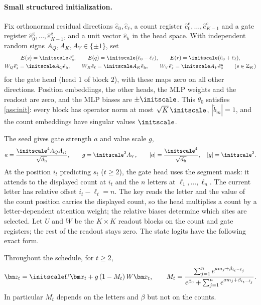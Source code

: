 \paragraph{Small structured initialization.} Fix orthonormal residual directions $\hat e_{0},\hat e_\ell$, a count register
$\hat e^{\mathrm c}_0,\ldots,\hat e^{\mathrm c}_{K-1}$ and a gate register $\hat e^{\mathrm g}_0,\ldots,\hat e^{\mathrm g}_{K-1}$, and a unit
vector $\hat e_{\mathrm h}$ in the head space. With independent random signs $A_Q,A_K,A_V\in\{\pm1\}$, set
\begin{gather*}
 E(s)=\initscale\,\hat e^{\mathrm c}_s,\qquad
 E(q)=\initscale(\hat e_{0}-\hat e_\ell),\qquad E(r)=\initscale(\hat e_{0}+\hat e_\ell),\\
 W_Q\hat e^{\mathrm c}_s=\initscale A_Q\hat e_{\mathrm h},\qquad W_K\hat e_\ell=\initscale A_K\hat e_{\mathrm h},\qquad
 W_V\hat e^{\mathrm c}_s=\initscale A_V\hat e^{\mathrm g}_s\qquad(s\in\mathbb Z_K)
\end{gather*}
for the gate head (head $1$ of block $2$), with these maps zero on all other directions. Position embeddings, the other heads, the MLP
weights and the readout are zero, and the MLP biases are $\pm\initscale$. This $\theta_0$ satisfies \cref{ass:init}: every block
has operator norm at most $\sqrt K\,\initscale$, $|\tilde b_m|=1$, and the count embeddings have singular values $\initscale$.

The seed gives gate strength $a$ and value scale $g$,
\[
 a=\frac{\initscale^4A_QA_K}{\sqrt{d_{\mathrm h}}},\qquad g=\initscale^2A_V,
 \qquad |a|=\frac{\initscale^4}{\sqrt{d_{\mathrm h}}},\quad |g|=\initscale^2.
\]
At the position $i_t$ predicting $s_t$ ($t\ge2$), the gate head uses the segment mask: it attends to the displayed count at $i_t$
and the $n$ letters at $\ell_1,\ldots,\ell_n$. The current letter has relative offset $i_t-\ell_t=n$.
The key reads the letter and the value of the count position carries the displayed count, so the head multiplies a count by a
letter-dependent attention weight; the relative biases determine which sites are selected.
Let $U$ and $W$ be the $K\times K$ readout blocks on the count and gate registers; the rest of the readout stays zero.
The state logits have the following exact form.

\begin{lemma}
\label{lem:R-features}
Throughout the schedule, for $t\ge2$,
\[
 \bm z_t=\initscale U\bm x_t+g\,(1-M_t)\,W\bm x_t,
 \qquad
 M_t=\frac{\sum_{j=1}^ne^{am_j+\beta_{i_t-\ell_j}}}{e^{\beta_0}+\sum_{j=1}^ne^{am_j+\beta_{i_t-\ell_j}}}.
\]
In particular $M_t$ depends on the letters and $\beta$ but not on the counts.
\end{lemma}

